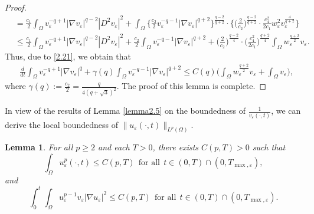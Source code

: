 \documentclass[12pt]{article}
\theoremstyle{plain}
\newtheorem{lemma}{Lemma}[section]
\theoremstyle{definition}
\numberwithin{equation}{section}
\begin{document}
\begin{proof}
\begin{equation*}
\begin{split}
            &=\frac{c_1}{2}\int_\Omega v_\varepsilon^{-q+1}|\nabla v_\varepsilon|^{q-2}|D^2v_\varepsilon|^2
            +\int_\Omega\bigg\{\frac{c_2}{2}v_\varepsilon^{-q-1}|\nabla v_\varepsilon|^{q+2}\bigg\}^{\frac{q-2}{q+2}}\cdot
            \bigg\{\bigg(\frac{2}{c_2}\bigg)^{\frac{q-2}{q+2}}\cdot\frac{c_4^2}{2c_1}w_\varepsilon^2v_\varepsilon^{\frac{4}{q+2}}\bigg\}\\
            &\leq\frac{c_1}{2}\int_\Omega v_\varepsilon^{-q+1}|\nabla v_\varepsilon|^{q-2}|D^2v_\varepsilon|^2+\frac{c_2}{2}\int_\Omega v_\varepsilon^{-q-1}|\nabla v_\varepsilon|^{q+2}+\bigg(\frac{2}{c_2}\bigg)^{\frac{q-2}{4}}
            \cdot\bigg(\frac{c_4^2}{2c_1}\bigg)^{\frac{q+2}{4}}\int_{\Omega}w_\varepsilon^{\frac{q+2}{2}}v_\varepsilon.
        \end{split}
    \end{equation*}
     Thus, due to \eqref{2.21}, we obtain that
    \begin{equation*}
        \begin{split}
            &\frac{d}{dt}\int_\Omega v_\varepsilon^{-q+1}|\nabla v_\varepsilon|^q+\gamma(q)\int_\Omega v_\varepsilon^{-q-1}|\nabla v_\varepsilon|^{q+2}\leq C(q)\bigg(\int_{\Omega}w_\varepsilon^{\frac{q+2}{2}}v_\varepsilon+\int_\Omega v_\varepsilon\bigg),
        \end{split}
    \end{equation*}
    where $\gamma(q):=\frac{c_2}{2}=\frac{q}{4(q+\sqrt{3})^2}$. The proof of this lemma is complete.
\end{proof}
In view of the results of Lemma \ref{lemma2.5} on the boundedness of $\frac{1}{v_\varepsilon(\cdot,t)}$, we can derive the local boundedness of $\|u_\varepsilon(\cdot,t)\|_{L^p(\Omega)}$.
\begin{lemma}\label{lemma2.8}
    For all $p\geq2$ and each $T>0$, there exists $C(p,T)>0$ such that
    \begin{equation}\label{2.25}
        \int_\Omega u_\varepsilon^p(\cdot,t)\leq C(p,T)~~\mbox{for all}~~ t\in(0,T)\cap(0,T_{\max,\varepsilon}),
    \end{equation}
    and
    \begin{equation}\label{2.26}
    \int_0^{t}\int_\Omega u_\varepsilon^{p-1}v_\varepsilon|\nabla u_\varepsilon|^2\leq C(p,T)~~\mbox{for all}~~ t\in(0,T)\cap(0,T_{\max,\varepsilon}).
    \end{equation}
\end{lemma}
\end{document}
